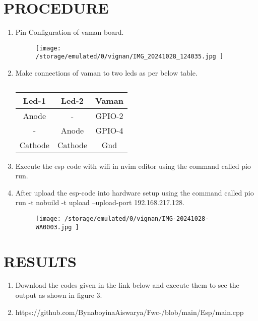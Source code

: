 \documentclass[conference]{IEEEtran}
\begin{document}
\section{PROCEDURE}
 \begin{enumerate}
\item Pin Configuration of vaman board.

\begin{figure}[h]                           
\centering                                 
\texttt{[image: /storage/emulated/0/vignan/IMG\_20241028\_124035.jpg	]}                                           
\caption{\label{fig-3:Gates}}               
\end{figure}

\item Make connections of vaman to two leds as per below table.

\begin{table} [htbp]
\centering
\begin{tabular}{| c | c | c |} \hline
Led-1 & Led-2 & Vaman \\\hline
Anode & - & GPIO-2 \\ \hline
 -  & Anode & GPIO-4 \\ \hline
Cathode & Cathode  & Gnd \\  
\hline
\end{tabular}
\vspace{0.1cm}
\caption{\label{tab:widgets}}
\end{table}


\item Execute the esp code with wifi in nvim editor using the command called pio run.
\item After upload the esp-code into hardware setup using the command called pio run -t nobuild -t upload --upload-port 192.168.217.128.
\begin{figure}[h]                       
\centering                               
\texttt{[image:  /storage/emulated/0/vignan/IMG-20241028-WA0003.jpg	]}                                
\caption{\label{fig-4:Gates}}             
\end{figure}


 \end{enumerate}

\section{RESULTS}
 \begin{enumerate}
\item Download the codes given in the link below and execute them to see the output as shown in figure 3.
\item https://github.com/BynaboyinaAiswarya/Fwc-/blob/main/Esp/main.cpp
 \end{enumerate}
\end{document}
